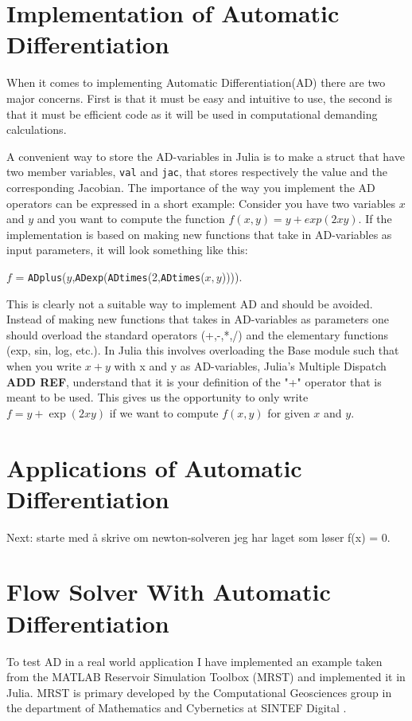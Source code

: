 \section{Implementation of Automatic Differentiation}
When it comes to implementing Automatic Differentiation(AD) there are two major concerns. First is that it must be easy and intuitive to use, the second is that it must be efficient code as it will be used in computational demanding calculations. 

A convenient way to store the AD-variables in Julia is to make a struct that have two member variables, \texttt{val} and \texttt{jac}, that stores respectively the value and the corresponding Jacobian. The importance of the way you implement the AD operators can be expressed in a short example: Consider you have two variables $x$ and $y$ and you want to compute the function $f(x,y) = y+exp(2xy)$. If the implementation is based on making new functions that take in AD-variables as input parameters, it will look something like this: 
\begin{center}
    $f$ = \texttt{ADplus}($y$,\texttt{ADexp}(\texttt{ADtimes}(2,\texttt{ADtimes}($x,y$)))).
\end{center}
This is clearly not a suitable way to implement AD and should be avoided. Instead of making new functions that takes in AD-variables as parameters one should overload the standard operators (+,-,*,/) and the elementary functions (exp, sin, log, etc.). In Julia this involves overloading the Base module such that when you write $x+y$ with x and y as AD-variables, Julia's Multiple Dispatch \textbf{ADD REF}, understand that it is your definition of the "+" operator that is meant to be used. This gives us the opportunity to only write $f = y+\exp(2xy)$ if we want to compute $f(x,y)$ for given $x$ and $y$. 
\section{Applications of Automatic Differentiation}
Next: starte med å skrive om newton-solveren jeg har laget som løser f(x) = 0.

\section{Flow Solver With Automatic Differentiation}
To test AD in a real world application I have implemented an example taken from the MATLAB Reservoir Simulation Toolbox (MRST) and implemented it in Julia. MRST is primary developed by the Computational Geosciences group in the department of Mathematics and Cybernetics at SINTEF Digital \emph{\cite{mrstHomepage}}. 

